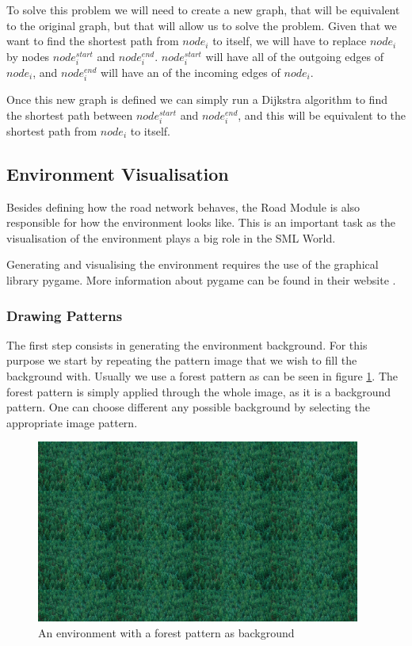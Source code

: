 To solve this problem we will need to create a new graph, that will be equivalent to the original graph, but that will allow us to solve the problem. Given that we want to find the shortest path from $node_i$ to itself, we will have to replace $node_i$ by nodes $node_i^{start}$ and $node_i^{end}$. $node_i^{start}$ will have all of the outgoing edges of $node_i$, and $node_i^{end}$ will have an of the incoming edges of $node_i$. 

Once this new graph is defined we can simply run a Dijkstra algorithm to find the shortest path between $node_i^{start}$ and $node_i^{end}$, and this will be equivalent to the shortest path from $node_i$ to itself.

\subsection{Environment Visualisation}

Besides defining how the road network behaves, the Road Module is also responsible for how the environment looks like. This is an important task as the visualisation of the environment plays a big role in the SML World.

Generating and visualising the environment requires the use of the graphical library pygame. More information about pygame can be found in their website \cite{pygame}.

\subsubsection{Drawing Patterns}

The first step consists in generating the environment background. For this purpose we start by repeating the pattern image that we wish to fill the background with. Usually we use a forest pattern as can be seen in figure \ref{fig:visualisation_background}. The forest pattern is simply applied through the whole image, as it is a background pattern. One can choose different any possible background by selecting the appropriate image pattern.

\begin{figure}[h!]
  \centering
    \includegraphics[width=0.95\textwidth]{visualisation_background}
    \caption{An environment with a forest pattern as background \label{fig:visualisation_background} }
\end{figure}

